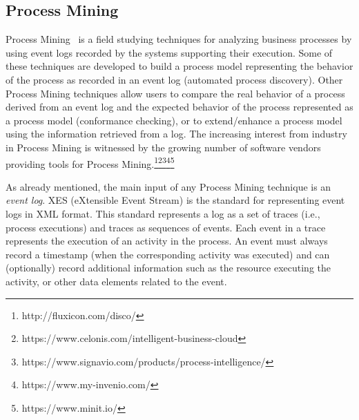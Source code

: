 \subsection{Process Mining}
\label{sec:procmining}

Process Mining~\cite{DBLP:books/sp/Aalst16} is a field studying techniques for analyzing business processes by using event logs recorded by the systems supporting their execution. Some of these techniques are developed to build a process model representing the behavior of the process as recorded in an event log (automated process discovery). Other Process Mining techniques allow users to compare the real behavior of a process derived from an event log and the expected behavior of the process represented as a process model (conformance checking), or to extend/enhance a process model using the information retrieved from a log.
The increasing interest from industry in Process Mining is witnessed by the growing number of software vendors providing tools for Process Mining.\footnote{http://fluxicon.com/disco/}\footnote{https://www.celonis.com/intelligent-business-cloud}\footnote{https://www.signavio.com/products/process-intelligence/}\footnote{https://www.my-invenio.com/}\footnote{https://www.minit.io/}
%

As already mentioned, the main input of any Process Mining technique is an \emph{event log}. XES (eXtensible Event Stream) \cite{XES-standard-2013,Verbeek10} is the standard for representing event logs in XML format. This standard represents a log as a set of traces (i.e., process executions) and traces as sequences of events. Each event in a trace represents the execution of an activity in the process. An event must always record a timestamp (when the corresponding activity was executed) and can (optionally) record additional information such as the resource executing the activity, or other data elements related to the event.



